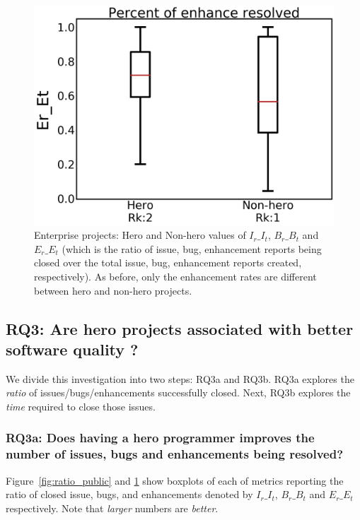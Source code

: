 \documentclass[sigconf]{acmart}
\theoremstyle{break}
\begin{document}
\begin{figure}[!t]
\begin{minipage}{.33\linewidth}
        \includegraphics[width=\linewidth]{./fig/Er_Et_w.png}
    \end{minipage}%
    \caption{Enterprise projects:   Hero and Non-hero values of $I_r\_I_t$, $B_r\_B_t$ and $E_r\_E_t$ (which is the ratio of  issue, bug, enhancement reports being closed over the total issue, bug, enhancement reports created, respectively).
As before,  only the enhancement rates are different between hero and non-hero projects.
    }
    \label{fig:ratio_enter}
\end{figure}







\subsection{RQ3: Are hero projects associated with  better software quality ?}
\label{sec:rq3}
We divide this investigation into two steps: RQ3a and RQ3b. RQ3a explores the {\em ratio} of issues/bugs/enhancements successfully closed.
Next, RQ3b explores the {\em time} required to close those issues.


\subsubsection{RQ3a: Does having a hero programmer improves the number of issues, bugs and enhancements being resolved?}
 
Figure~\ref{fig:ratio_public} and \ref{fig:ratio_enter} show   boxplots of each of   metrics
reporting the ratio of closed issue, bugs, and enhancements denoted by
$I_r\_I_t$, $B_r\_B_t$ and $E_r\_E_t$  respectively. Note that {\em larger} numbers are {\em better}.
\end{document}
